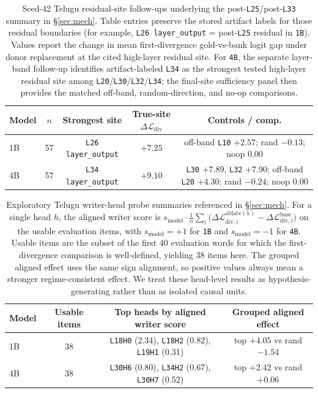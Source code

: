 \documentclass{article}
\begin{document}
\begin{table}[H]
\centering
\small
\setlength{\tabcolsep}{5pt}
\begin{tabular}{lcccc}
\toprule
\textbf{Model} & \textbf{$n$} & \textbf{Strongest site} & \textbf{True-site $\Delta \mathcal{L}_{\mathrm{div}}$} & \textbf{Controls / comp.} \\
\midrule
1B & 57 & \texttt{L26 layer\_output} & $+7.25$ & off-band \texttt{L10} $+2.57$; rand $-0.13$; noop $0.00$ \\
4B & 57 & \texttt{L34 layer\_output} & $+9.10$ & \texttt{L30} $+7.89$, \texttt{L32} $+7.90$; off-band \texttt{L20} $+4.30$; rand $-0.24$; noop $0.00$ \\
\bottomrule
\end{tabular}
\caption{Seed-42 Telugu residual-site follow-ups underlying the post-\texttt{L25}/post-\texttt{L33} summary in \S\ref{sec:mech}. Table entries preserve the stored artifact labels for those residual boundaries (for example, \texttt{L26 layer\_output} = post-\texttt{L25} residual in \texttt{1B}). Values report the change in mean first-divergence gold-vs-bank logit gap under donor replacement at the cited high-layer residual site. For \texttt{4B}, the separate layer-band follow-up identifies artifact-labeled \texttt{L34} as the strongest tested high-layer residual site among \texttt{L20}/\texttt{L30}/\texttt{L32}/\texttt{L34}; the final-site sufficiency panel then provides the matched off-band, random-direction, and no-op comparisons.}
\label{tab:telugu_late_sites}
\end{table}

\begin{table}[H]
\centering
\small
\setlength{\tabcolsep}{7pt}
\begin{tabular}{lccc}
\toprule
\textbf{Model} & \textbf{Usable items} & \textbf{Top heads by aligned writer score} & \textbf{Grouped aligned effect} \\
\midrule
1B & 38 & \texttt{L18H0} (2.34), \texttt{L18H2} (0.82), \texttt{L19H1} (0.31) & top $+4.05$ vs rand $-1.54$ \\
4B & 38 & \texttt{L30H6} (0.80), \texttt{L34H2} (0.67), \texttt{L30H7} (0.52) & top $+2.42$ vs rand $+0.06$ \\
\bottomrule
\end{tabular}
\caption{Exploratory Telugu writer-head probe summaries referenced in \S\ref{sec:mech}. For a single head $h$, the aligned writer score is $s_{\mathrm{model}} \cdot \frac{1}{n}\sum_i \big(\Delta \mathcal{L}^{\mathrm{ablate}(h)}_{\mathrm{div},i} - \Delta \mathcal{L}^{\mathrm{base}}_{\mathrm{div},i}\big)$ on the usable evaluation items, with $s_{\mathrm{model}}{=}+1$ for \texttt{1B} and $s_{\mathrm{model}}{=}-1$ for \texttt{4B}. Usable items are the subset of the first 40 evaluation words for which the first-divergence comparison is well-defined, yielding 38 items here. The grouped aligned effect uses the same sign alignment, so positive values always mean a stronger regime-consistent effect. We treat these head-level results as hypothesis-generating rather than as isolated causal units.}
\label{tab:telugu_writer_heads}
\end{table}
\end{document}
